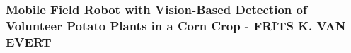 	\subsubsection{Mobile Field Robot with Vision-Based Detection of Volunteer Potato Plants in a Corn Crop - FRITS K. VAN EVERT}
	\cite{potato}
